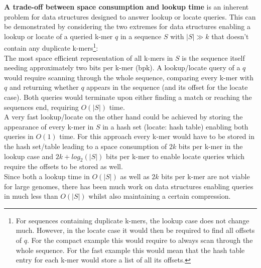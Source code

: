 \documentclass[a4paper,titlepage,onecolumn,oneside,12pt,nenglish,titlepage=firstiscover]{scrbook}
\theoremstyle{plain} %
\theoremstyle{definition} %
\theoremstyle{remark} %
\theoremstyle{plain}
\begin{document}
\textbf{A trade-off between space consumption and lookup time} is an inherent problem for data structures designed to answer lookup or locate queries. This can be demonstrated by considering the two extremes for data structures enabling a lookup or locate of a queried k-mer $q$ in a sequence $S$ with $|S| \gg k$ that doesn't contain any duplicate k-mers\footnote{For sequences containing duplicate k-mers, the lookup case does not change much. However, in the locate case it would then be required to find all offsets of $q$. For the compact example this would require to always scan through the whole sequence. For the fast example this would mean that the hash table entry for each k-mer would store a list of all its offsets.}:\\
The most space efficient representation of all k-mers in $S$ is the sequence itself needing approximately two bits per k-mer (bpk). A lookup/locate query of a $q$ would require scanning through the whole sequence, comparing every k-mer with $q$ and returning whether $q$ appears in the sequence (and its offset for the locate case). Both queries would terminate upon either finding a match or reaching the sequences end, requiring $O(|S|)$ time.\\
A very fast lookup/locate on the other hand could be achieved by storing the appearance of every k-mer in $S$ in a hash set (locate: hash table) enabling both queries in $O(1)$ time. For this approach every k-mer would have to be stored in the hash set/table leading to a space consumption of $2k$ bits per k-mer in the lookup case and  $2k+log_2(|S|)$ bits per k-mer to enable locate queries which require the offsets to be stored as well.\\
Since both a lookup time in $O(|S|)$ as well as $2k$ bits per k-mer are not viable for large genomes, there has been much work on data structures enabling queries in much less than $O(|S|)$ whilst also maintaining a certain compression.
\end{document}
